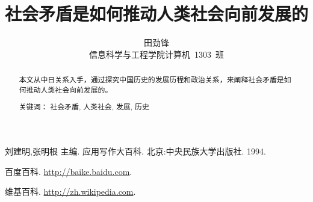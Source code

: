 \documentclass[cs4size,a4paper,nofonts]{ctexart}
\def\tjf{田劲锋}
\def\titlec{社会矛盾是如何推动人类社会向前发展的}
\begin{document}

\title{\titlec}
\author{\tjf\\
信息科学与工程学院\quad 计算机~1303~班}
\maketitle

\begin{abstract}
本文从中日关系入手，通过探究中国历史的发展历程和政治关系，来阐释社会矛盾是如何推动人类社会向前发展的。

关键词： 社会矛盾, 人类社会, 发展, 历史
\end{abstract}

\tableofcontents



\begin{thebibliography}{10}
\item 刘建明,张明根 主编. 应用写作大百科. 北京:中央民族大学出版社. 1994.
\item 百度百科. \url{http://baike.baidu.com}.
\item 维基百科. \url{http://zh.wikipedia.com}.
\end{thebibliography}

\end{document}
